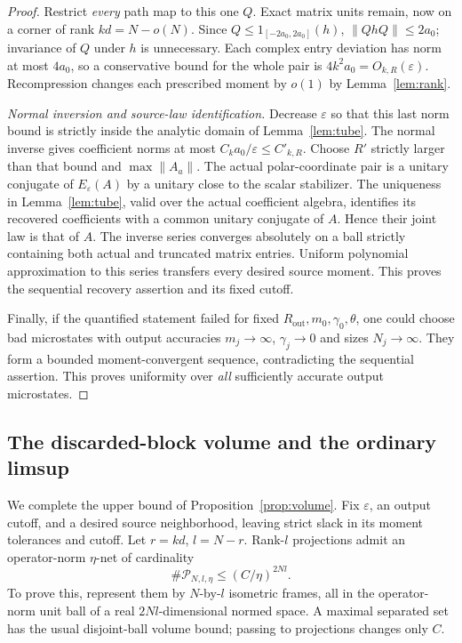 \documentclass[11pt]{article}
\theoremstyle{definition}\newtheorem{definition}[theorem]{Definition}
\theoremstyle{remark}\newtheorem{remark}[theorem]{Remark}
\newcommand{\eps}{\varepsilon}\newcommand{\id}{\mathrm{id}}
\begin{document}
\begin{proof}
Restrict \emph{every} path map to this one $Q$. Exact matrix units
remain, now on a corner of rank $kd=N-o(N)$. Since
$Q\leq1_{[-2a_0,2a_0]}(h)$,
$\|QhQ\|\leq2a_0$; invariance of $Q$ under $h$ is unnecessary.
Each complex entry deviation has norm at most $4a_0$, so a conservative
bound for the whole pair is $4k^2a_0=O_{k,R}(\eps)$.
Recompression changes each prescribed moment by $o(1)$ by
Lemma~\ref{lem:rank}.

\emph{Normal inversion and source-law identification.}
Decrease $\eps$ so that this last norm bound is strictly inside the
analytic domain of Lemma~\ref{lem:tube}. The normal inverse gives
coefficient norms at most $C_k a_0/\eps\leq C'_{k,R}$.
Choose $R'$ strictly larger than that bound and $\max\|A_a\|$.
The actual polar-coordinate pair is a unitary conjugate of $E_\eps(A)$
by a unitary close to the scalar stabilizer. The uniqueness in
Lemma~\ref{lem:tube}, valid over the actual coefficient algebra,
identifies its recovered coefficients with a common unitary conjugate
of $A$. Hence their joint law is that of $A$.
The inverse series converges absolutely on a ball strictly containing
both actual and truncated matrix entries. Uniform polynomial
approximation to this series transfers every desired source moment.
This proves the sequential recovery assertion and its fixed cutoff.

Finally, if the quantified statement failed for fixed
$R_{\mathrm{out}},m_0,\gamma_0,\theta$, one could choose bad microstates
with output accuracies $m_j\to\infty$, $\gamma_j\to0$ and sizes
$N_j\to\infty$. They form a bounded moment-convergent sequence,
contradicting the sequential assertion. This proves uniformity over
\emph{all} sufficiently accurate output microstates.
\end{proof}

\subsection{The discarded-block volume and the ordinary limsup}
We complete the upper bound of Proposition~\ref{prop:volume}.
Fix $\eps$, an output cutoff, and a desired source neighborhood, leaving
strict slack in its moment tolerances and cutoff. Let $r=kd$, $l=N-r$.
Rank-$l$ projections admit an operator-norm $\eta$-net of cardinality
\begin{equation}\label{eq:net}
 \#\mathcal P_{N,l,\eta}\leq(C/\eta)^{2Nl}.
\end{equation}
To prove this, represent them by $N$-by-$l$ isometric frames, all in
the operator-norm unit ball of a real $2Nl$-dimensional normed space.
A maximal separated set has the usual disjoint-ball volume bound;
passing to projections changes only $C$.
\end{document}
